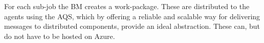\documentclass[conference,final]{IEEEtran}
\newcommand{\up}{\vspace*{-1em}}
\newcommand{\alnote}[1]{ {\textcolor{blue} { ***AL: #1 }}}
\newcommand{\jhanote}[1]{ {\textcolor{red} { ***SJ: #1 }}}
\newcommand{\alnote}[1]{}
\newcommand{\jhanote}[1]{}
\begin{document}
For each sub-job the BM creates a work-package. These are distributed
to the agents using the AQS, which by offering a reliable and scalable
way for delivering messages to distributed components, provide an
ideal abstraction. These can, but do not have to be hosted on Azure.




\end{document}
